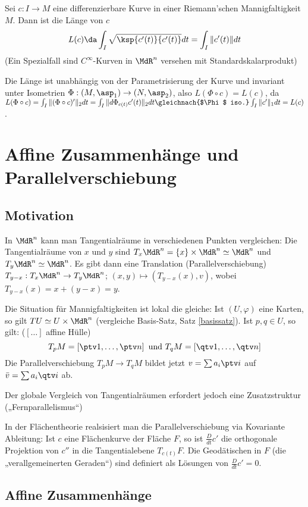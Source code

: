 \documentclass[a4paper,twoside,DIV15,BCOR12mm]{scrbook}
\begin{document}
Sei $c: I \to M$ eine differenzierbare Kurve in einer Riemann’schen Mannigfaltigkeit $M$. Dann ist die Länge von $c$
\[
L(c) \da \int_I \sqrt{\ksp {c'(t)}{c'(t)}}dt  = \int _I \|c'(t)\|dt
\]
(Ein Spezialfall sind $C^\infty$-Kurven in $\MdR^n$ versehen mit Standardskalarprodukt)

Die Länge ist unabhängig von der Parametrisierung der Kurve und invariant unter Isometrien $\Phi : (M,\asp_1) \to (N,\asp_2)$, also $L(\Phi \circ c) = L(c)$, da $L(\Phi \circ c) = \int_I\|(\Phi \circ c)'\|_2dt = \int_I\|d\Phi_{c(t)}c'(t)\|_2dt \gleichnach{$\Phi$ iso.} \int_I\|c'\|_1dt = L(c)$.


\chapter{Affine Zusammenhänge und Parallelverschiebung}

\section{Motivation}

In $\MdR^n$ kann man Tangentialräume in verschiedenen Punkten vergleichen:
Die Tangentialräume von $x$ und $y$ sind $T_x\MdR^n = \{x\}\times \MdR^n \simeq \MdR^n$ und $T_y\MdR^n \simeq \MdR^n$. Es gibt dann eine Translation (Parallelverschiebung) $T_{y-x}:T_x\MdR^n \to T_y\MdR^n$; $(x,y)\mapsto (T_{y-x}(x), v)$, wobei $T_{y-x}(x) = x + (y-x) = y$.

Die Situation für Mannigfaltigkeiten ist lokal die gleiche: Ist $(U,\varphi)$ eine Karten, so gilt $TU \simeq U\times\MdR^n$ (vergleiche Basis-Satz, Satz \ref{basissatz}). Ist $p,q\in U$, so gilt: ($[\ldots]$ affine Hülle)
\[ T_pM = \left[ \ptv1,\ldots, \ptv n \right] \text{ und } T_qM = \left[ 
\qtv1 ,\ldots, \qtv n
 \right] \]
 Die Parallelverschiebung $T_pM \to T_qM$ bildet jetzt 
$v=\sum a_i \ptv i$ auf $\bar v = \sum a_i \qtv i$ ab.

Der globale Vergleich von Tangentialräumen erfordert jedoch eine Zusatzstruktur („Fernparallelismus“)

In der Flächentheorie realsisiert man die Parallelverschiebung via Kovariante Ableitung: Ist $c$ eine Flächenkurve der Fläche $F$, so ist $\frac D {dt} c'$ die orthogonale Projektion von $c''$  in die Tangentialebene $T_{c(t)}F$. Die Geodätischen in $F$ (die „verallgemeinerten Geraden“) sind definiert als Lösungen von $\frac D {dt} c' = 0$.

\section{Affine Zusammenhänge}
\end{document}
